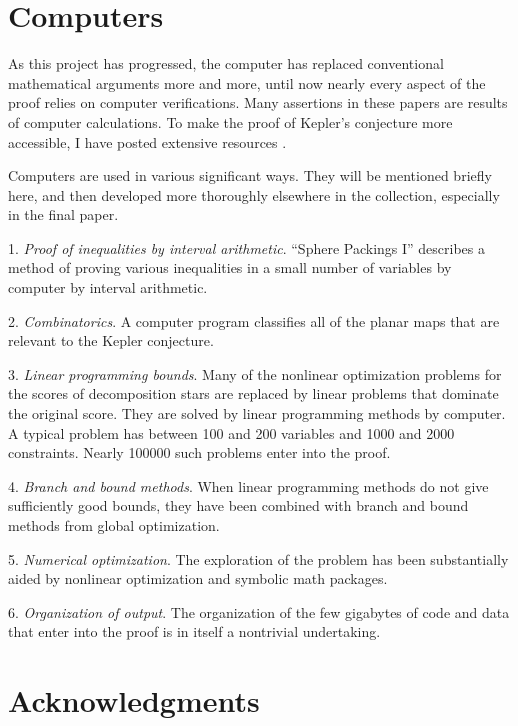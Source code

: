 \section{Computers}

As this project has progressed, the computer has replaced conventional
mathematical arguments more and more, until now
 nearly every aspect of the proof relies on
computer verifications.  Many assertions in these papers
 are results of computer calculations.
To make the proof of Kepler's conjecture more accessible, I have
posted extensive resources \cite{arXiv}.

Computers are used in various significant ways.  They will be
mentioned briefly here, and then developed more thoroughly elsewhere
in the collection, especially in the final paper.

1. {\it  Proof of inequalities by interval arithmetic}.  ``Sphere Packings
I'' describes a method of proving various inequalities in a small number
of variables by computer by interval arithmetic.

2.  {\it Combinatorics}.  A computer program classifies all of the planar maps
that are relevant to the Kepler conjecture.

3. {\it  Linear programming bounds}.  Many of the nonlinear optimization
    problems for the scores of decomposition stars are replaced by linear
    problems that dominate the original score.  They are solved
    by linear programming methods by computer.  A typical problem has
    between 100 and 200 variables and 1000 and 2000 constraints.  Nearly
    100000
    such problems enter into the proof.

4. {\it Branch and bound methods}.  When linear programming methods do not
    give sufficiently good bounds, they have been combined with branch
    and bound methods from global optimization.

5.  {\it Numerical optimization}.  The exploration of the problem
    has been substantially
    aided by nonlinear optimization and symbolic math packages.

6. {\it Organization of output}.
    The organization of the few gigabytes of code and data that
    enter into the proof is in itself a nontrivial undertaking.




\section{Acknowledgments}
\label{sec:ack}

